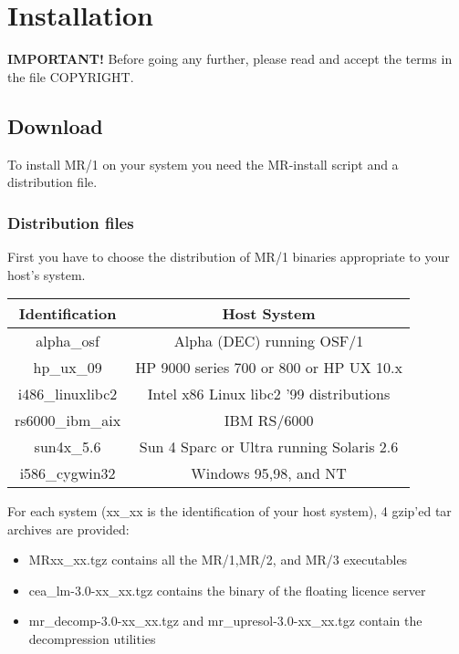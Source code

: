  
\chapter{Installation}
\label{ch_install}
 
\textbf{IMPORTANT!} Before going any further, please read and accept the terms
in the file COPYRIGHT.


\section{Download}

To install MR/1 on your system you need the MR-install script and 
a distribution file.


\subsection{Distribution files}

First you have to choose the distribution of MR/1 binaries appropriate to your
host's system.

\vspace{0.3cm}
{\centering \begin{tabular}{|c|c|}
\hline 
Identification&
Host System\\
\hline 
\hline 
alpha\_osf&
Alpha (DEC) running OSF/1\\
\hline 
hp\_ux\_09&
HP 9000 series 700 or 800 or HP UX 10.x\\
\hline 
i486\_linuxlibc2&
Intel x86 Linux libc2 '99 distributions\\
\hline 
rs6000\_ibm\_aix&
IBM RS/6000 \\
\hline 
sun4x\_5.6&
Sun 4 Sparc or Ultra running Solaris 2.6\\
\hline 
i586\_cygwin32 & Windows 95,98, and NT\\
\hline
\end{tabular}\par}
\vspace{0.3cm}

For each system (xx\_xx is the identification of your host system), 4 gzip'ed
tar archives are provided:

\begin{itemize}
\item MR\-xx\_xx.tgz contains all the MR/1,MR/2, and MR/3 executables
\item cea\_lm-3.0-xx\_xx.tgz contains the binary of the floating licence server
\item mr\_decomp-3.0-xx\_xx.tgz and mr\_upresol-3.0-xx\_xx.tgz contain 
the decompression utilities
\end{itemize}

